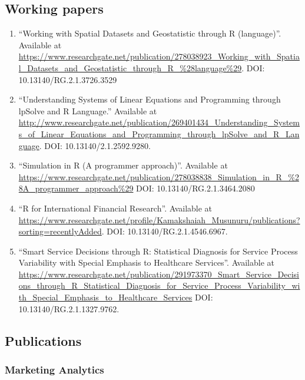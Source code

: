 \documentclass[10pt]{article}
\begin{document}
\subsection{Working papers}

\begin{enumerate} 

\item \enquote{Working with Spatial Datasets and Geostatistic through R (language)}. Available at \url{https://www.researchgate.net/publication/278038923_Working_with_Spatial_Datasets_and_Geostatistic_through_R_\%28language\%29}. DOI: 10.13140/RG.2.1.3726.3529

\item \enquote{Understanding Systems of Linear Equations and Programming through lpSolve and R Language.} Available at \url{http://www.researchgate.net/publication/269401434_Understanding_Systems_of_Linear_Equations_and_Programming_through_lpSolve_and_R_Language}. DOI: 10.13140/2.1.2592.9280. 

\item  \enquote{Simulation in R (A programmer approach)}. Available at  \url{https://www.researchgate.net/publication/278038838_Simulation_in_R_\%28A_programmer_approach\%29} DOI: 10.13140/RG.2.1.3464.2080

\item \enquote{R for International Financial Research}. Available at  \url{https://www.researchgate.net/profile/Kamakshaiah_Musunuru/publications?sorting=recentlyAdded}. DOI: 10.13140/RG.2.1.4546.6967.  

\item \enquote{Smart Service Decisions through R: Statistical Diagnosis for Service Process Variability with Special Emphasis to Healthcare Services}. Available at  \url{https://www.researchgate.net/publication/291973370_Smart_Service_Decisions_through_R_Statistical_Diagnosis_for_Service_Process_Variability_with_Special_Emphasis_to_Healthcare_Services} DOI: 10.13140/RG.2.1.1327.9762.  


\end{enumerate} 

\subsection{Publications}

\subsubsection{Marketing Analytics}
\end{document}
